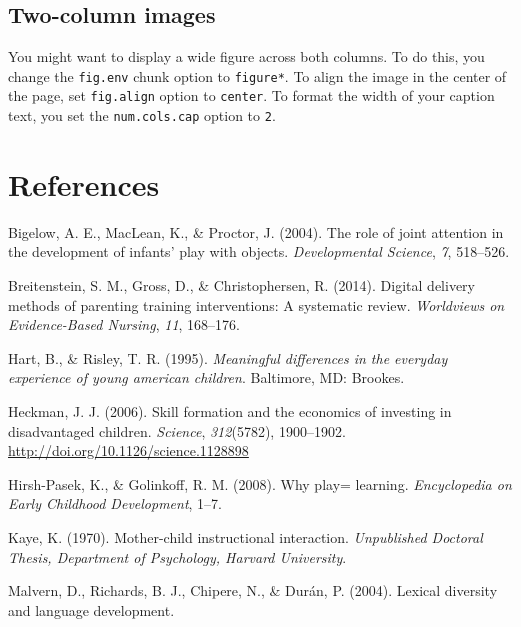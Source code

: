 \documentclass[10pt, letterpaper]{article}
\begin{document}
\subsection{Two-column images}\label{two-column-images}

You might want to display a wide figure across both columns. To do this,
you change the \texttt{fig.env} chunk option to \texttt{figure*}. To
align the image in the center of the page, set \texttt{fig.align} option
to \texttt{center}. To format the width of your caption text, you set
the \texttt{num.cols.cap} option to \texttt{2}.

\section{References}\label{references}

\setlength{\parindent}{-0.1in} \setlength{\leftskip}{0.125in} \noindent

\hypertarget{refs}{}
\hypertarget{ref-Bigelow2004}{}
Bigelow, A. E., MacLean, K., \& Proctor, J. (2004). The role of joint
attention in the development of infants' play with objects.
\emph{Developmental Science}, \emph{7}, 518--526.

\hypertarget{ref-Breitenstein2014}{}
Breitenstein, S. M., Gross, D., \& Christophersen, R. (2014). Digital
delivery methods of parenting training interventions: A systematic
review. \emph{Worldviews on Evidence-Based Nursing}, \emph{11},
168--176.

\hypertarget{ref-Hart1995}{}
Hart, B., \& Risley, T. R. (1995). \emph{Meaningful differences in the
everyday experience of young american children}. Baltimore, MD: Brookes.

\hypertarget{ref-Heckman2006}{}
Heckman, J. J. (2006). Skill formation and the economics of investing in
disadvantaged children. \emph{Science}, \emph{312}(5782), 1900--1902.
\url{http://doi.org/10.1126/science.1128898}

\hypertarget{ref-Hirsh2008}{}
Hirsh-Pasek, K., \& Golinkoff, R. M. (2008). Why play= learning.
\emph{Encyclopedia on Early Childhood Development}, 1--7.

\hypertarget{ref-Kaye1970}{}
Kaye, K. (1970). Mother-child instructional interaction.
\emph{Unpublished Doctoral Thesis, Department of Psychology, Harvard
University}.

\hypertarget{ref-Malvern2004}{}
Malvern, D., Richards, B. J., Chipere, N., \& Durán, P. (2004). Lexical
diversity and language development.
\end{document}
